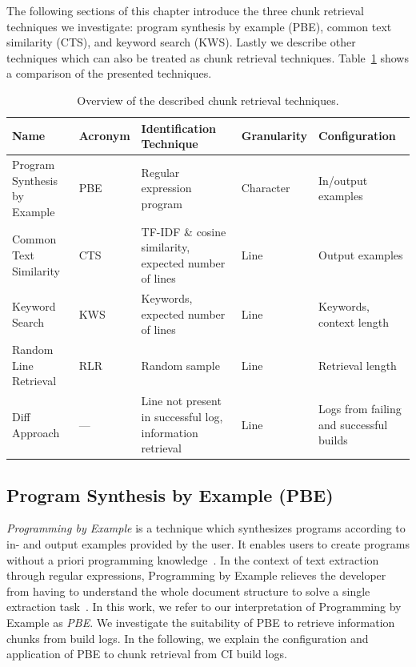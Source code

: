 \documentclass[\myrootdir/main.tex]{subfiles}
\begin{document}
The following sections of this chapter introduce the three chunk retrieval techniques we investigate: program synthesis by example (PBE), common text similarity (CTS), and keyword search (KWS).
Lastly we describe other techniques which can also be treated as chunk retrieval techniques.
Table~\ref{tab:ctr} shows a comparison of the presented techniques.

\begin{table}[H]
\centering
\caption{Overview of the described chunk retrieval techniques.}
\begin{tabularx}{\textwidth}{@{}XlXlX@{}} 
\toprule
Name                         & Acronym & Identification Technique                                   & Granularity & Configuration             \\ 
\midrule
Program Synthesis by Example & PBE     & Regular expression program                                 & Character   & In/output examples      \\
Common Text Similarity       & CTS     & TF-IDF \& cosine similarity, expected number of lines & Line        & Output examples           \\
Keyword Search               & KWS     & Keywords, expected number of lines                    & Line        & Keywords, context length  \\
Random Line Retrieval        & RLR     & Random sample                                              & Line        & Retrieval length          \\
Diff Approach                & ---     & Line not present in successful log, information retrieval  & Line        & Logs from failing and successful builds      \\
\bottomrule
\end{tabularx}
\label{tab:ctr}
\end{table}

\subsection{Program Synthesis by Example (PBE)}
\label{sec:expl-pbe}
\emph{Programming by Example} is a technique which synthesizes programs according to in- and output examples provided by the user.
It enables users to create programs without a priori programming knowledge~\cite{mayer2015user}.
In the context of text extraction through regular expressions, Programming by Example relieves the developer from having to understand the whole document structure to solve a single extraction task~\cite{le2014flashextract:}.
In this work, we refer to our interpretation of Programming by Example as \emph{PBE}\@.
We investigate the suitability of PBE to retrieve information chunks from build logs.
In the following, we explain the configuration and application of PBE to chunk retrieval from CI build logs.
\end{document}
